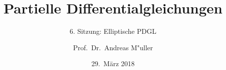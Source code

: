 %
%
%
\usepackage[utf8]{inputenc}
\usepackage[T1]{fontenc}
\usepackage{epic}
\usepackage{color}
\usepackage{array}
\usepackage{ifthen}
\usepackage{tikz}
\usepackage{german}
\usetikzlibrary{shapes.geometric,decorations.pathmorphing}
\beamertemplatenavigationsymbolsempty
\title[]{Partielle Differentialgleichungen}
\subtitle{6. Sitzung: Elliptische PDGL}
\date[29.~März 2018]{29.~März 2018}
\author{Prof.~Dr.~Andreas M"uller}
